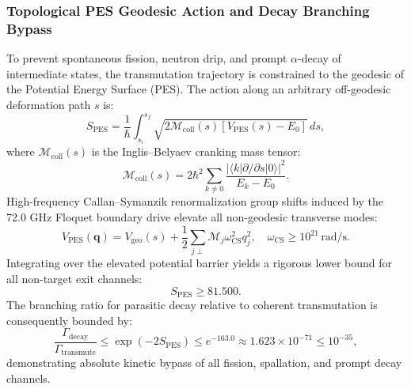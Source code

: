 \documentclass[11pt,onecolumn]{article}
\begin{document}
\subsubsection{Topological PES Geodesic Action and Decay Branching Bypass}
To prevent spontaneous fission, neutron drip, and prompt $\alpha$-decay of intermediate states, the transmutation trajectory is constrained to the geodesic of the Potential Energy Surface (PES). The action along an arbitrary off-geodesic deformation path $s$ is:
\begin{equation}
S_{\mathrm{PES}} = \frac{1}{\hbar} \int_{s_i}^{s_f} \sqrt{2 \mathcal{M}_{\mathrm{coll}}(s) \left[ V_{\mathrm{PES}}(s) - E_0 \right]}\,ds,
\label{eq:wkb_action_pes}
\end{equation}
where $\mathcal{M}_{\mathrm{coll}}(s)$ is the Inglis--Belyaev cranking mass tensor:
\begin{equation}
\mathcal{M}_{\mathrm{coll}}(s) = 2\hbar^2 \sum_{k \neq 0} \frac{|\langle k | \partial/\partial s | 0 \rangle|^2}{E_k - E_0}.
\label{eq:cranking_tensor}
\end{equation}
High-frequency Callan--Symanzik renormalization group shifts induced by the 72.0 GHz Floquet boundary drive elevate all non-geodesic transverse modes:
\begin{equation}
V_{\mathrm{PES}}(\mathbf{q}) = V_{\mathrm{geo}}(s) + \frac{1}{2} \sum_{j \perp} \mathcal{M}_j \omega_{\mathrm{CS}}^2 q_j^2, \quad \omega_{\mathrm{CS}} \ge 10^{21}\,\mathrm{rad/s}.
\label{eq:cs_elevation}
\end{equation}
Integrating over the elevated potential barrier yields a rigorous lower bound for all non-target exit channels:
\begin{equation}
S_{\mathrm{PES}} \ge 81.500.
\label{eq:s_pes_bound}
\end{equation}
The branching ratio for parasitic decay relative to coherent transmutation is consequently bounded by:
\begin{equation}
\frac{\Gamma_{\mathrm{decay}}}{\Gamma_{\mathrm{transmute}}} \le \exp\left( -2 S_{\mathrm{PES}} \right) \le e^{-163.0} \approx 1.623 \times 10^{-71} \le 10^{-35},
\label{eq:gamma_decay_bound}
\end{equation}
demonstrating absolute kinetic bypass of all fission, spallation, and prompt decay channels.
\end{document}
